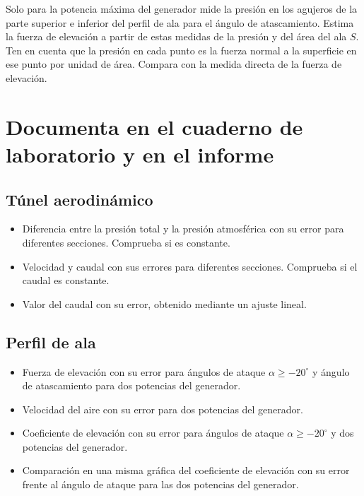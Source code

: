 \documentclass[11pt]{articulo}
\begin{document}
Solo para la potencia m\'axima del generador mide la presi\'on en los agujeros de la parte superior e inferior del perfil de ala para el \'angulo de atascamiento. Estima la fuerza de elevaci\'on a partir de estas medidas de la presi\'on y del \'area del ala $S$. Ten en cuenta que la presi\'on en cada punto es la fuerza normal a la superficie en ese punto por unidad de \'area. Compara con la medida directa de la fuerza de elevaci\'on.

\newpage
\section*{Documenta en el cuaderno de laboratorio y en el informe}

\subsection*{T\'unel aerodin\'amico}

\begin{itemize}

\item{Diferencia entre la presi\'on total y la presi\'on atmosf\'erica con su error para diferentes secciones. Comprueba si es constante.}
\item{Velocidad y caudal con sus errores para diferentes secciones. Comprueba si el caudal es constante.}
\item{Valor del caudal con su error, obtenido mediante un ajuste lineal.}

\end{itemize}

\subsection*{Perfil de ala}

\begin{itemize}

\item{Fuerza de elevaci\'on con su error para \'angulos de ataque $\alpha \geq -20^{\circ}$ y \'angulo de atascamiento para dos potencias del generador.}
\item{Velocidad del aire con su error para dos potencias del generador.}
\item{Coeficiente de elevaci\'on con su error para \'angulos de ataque $\alpha \geq -20^{\circ}$ y dos potencias del generador.}
\item{Comparaci\'on en una misma gr\'afica del coeficiente de elevaci\'on con su error frente al \'angulo de ataque para las dos potencias del generador.}

\end{itemize}
\end{document}
